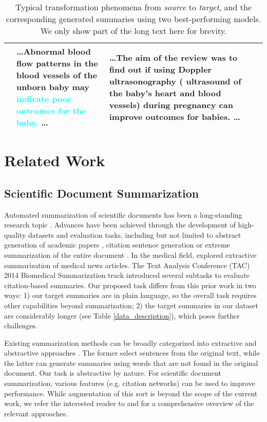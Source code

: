\documentclass[letterpaper, table]{article} %
\begin{document}
\begin{table*}[t!]
\begin{tabular}{@{}m{1.4cm}<{\centering}m{3.55cm}<{\centering}m{3.55cm}<{\centering}m{3.55cm}<{\centering}m{3.55cm}<{\centering} @{}}
& \ldots Abnormal blood flow patterns in the blood vessels of the unborn baby may \textcolor{cyan}{indicate poor outcomes for the baby.}  \ldots
& \ldots The aim of the review was to find out if using Doppler ultrasonography ( ultrasound of the baby's heart and blood vessels) during pregnancy can improve outcomes for babies. \ldots \\
\bottomrule
\end{tabular}
\caption{Typical transformation phenomena from \textit{source} to \textit{target}, and the corresponding generated summaries using two best-performing models. We only show part of the long text here for brevity.}
\label{transformation_case_study}

\end{table*}











\section{Related Work}
\subsection{Scientific Document Summarization}
Automated summarization of scientific documents has been a long-standing research topic \cite{Paice1980TheAG,teufel2002summarization}. Advances have been achieved through the development of high-quality datasets and evaluation tasks, including but not limited to abstract generation of academic papers \cite{Cohan2018ADA}, citation sentence generation \cite{Luu2020CitationTG} or extreme
summarization of the entire document \cite{Cachola2020TLDRES}. In the medical field, \citet{Sarkar2011UsingML} explored extractive summarization of medical news articles.
The Text Analysis Conference (TAC) 2014 Biomedical Summarization track introduced several subtasks to evaluate citation-based summaries.
Our proposed task differs from this prior work in two ways: 1) our target summaries are in plain language, so the overall task requires other capabilities beyond summarization;
2) the target summaries in our dataset are considerably longer (see Table \ref{data_description}), which poses further challenges.

Existing summarization methods can be broadly categorized into extractive and abstractive approaches \cite{Andr2007ASO}. The former \cite{Erkan2004LexRankGC, Cheng2016NeuralSB} select sentences from the original text, while the latter \cite{rush2015abstractive, nallapati2016abstractive} can generate summaries using words that are not found in the original document. Our task is abstractive by nature. For scientific document summarization, various features (e.g. citation networks) can be used to improve performance. While augmentation of this sort is beyond the scope of the current work, we refer the interested reader to \citet{Altmami2020AutomaticSO} and \citet{ Moradi2019TextSI} for a  comprehensive overview of the relevant approaches.
\end{document}
